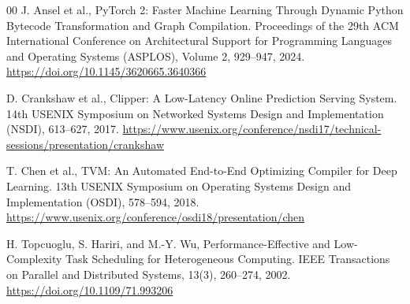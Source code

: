 \documentclass[conference]{IEEEtran}
\begin{document}
\begin{thebibliography}{00}
J. Ansel et al., PyTorch 2: Faster Machine Learning Through
Dynamic Python Bytecode Transformation and Graph Compilation.
Proceedings of the 29th ACM International Conference on
Architectural Support for Programming Languages and Operating
Systems (ASPLOS), Volume 2, 929--947, 2024.
\url{https://doi.org/10.1145/3620665.3640366}

D. Crankshaw et al., Clipper: A Low-Latency Online Prediction
Serving System. 14th USENIX Symposium on Networked Systems
Design and Implementation (NSDI), 613--627, 2017.
\url{https://www.usenix.org/conference/nsdi17/technical-sessions/presentation/crankshaw}

T. Chen et al., TVM: An Automated End-to-End Optimizing Compiler
for Deep Learning. 13th USENIX Symposium on Operating Systems
Design and Implementation (OSDI), 578--594, 2018.
\url{https://www.usenix.org/conference/osdi18/presentation/chen}

H. Topcuoglu, S. Hariri, and M.-Y. Wu, Performance-Effective and
Low-Complexity Task Scheduling for Heterogeneous Computing. IEEE
Transactions on Parallel and Distributed Systems, 13(3),
260--274, 2002.
\url{https://doi.org/10.1109/71.993206}

\end{thebibliography}


\end{document}
